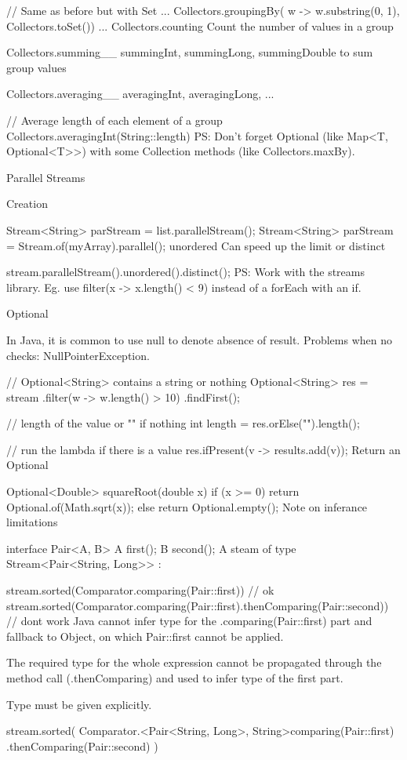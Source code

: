 // Same as before but with Set
... Collectors.groupingBy(
	w -> w.substring(0, 1), Collectors.toSet()) ...
Collectors.counting Count the number of values in a group

Collectors.summing\_\_ summingInt, summingLong, summingDouble to sum group values

Collectors.averaging\_\_ averagingInt, averagingLong, ...

// Average length of each element of a group
Collectors.averagingInt(String::length)
PS: Don't forget Optional (like Map<T, Optional<T>>) with some Collection methods (like Collectors.maxBy).

Parallel Streams

Creation

Stream<String> parStream = list.parallelStream();
Stream<String> parStream = Stream.of(myArray).parallel();
unordered Can speed up the limit or distinct

stream.parallelStream().unordered().distinct();
PS: Work with the streams library. Eg. use filter(x -> x.length() < 9) instead of a forEach with an if.

Optional

In Java, it is common to use null to denote absence of result. Problems when no checks: NullPointerException.

// Optional<String> contains a string or nothing
Optional<String> res = stream
   .filter(w -> w.length() > 10)
   .findFirst();

// length of the value or "" if nothing
int length = res.orElse("").length();

// run the lambda if there is a value
res.ifPresent(v -> results.add(v));
Return an Optional

Optional<Double> squareRoot(double x) {
   if (x >= 0) { return Optional.of(Math.sqrt(x)); }
   else { return Optional.empty(); }
}
Note on inferance limitations

interface Pair<A, B> {
    A first();
    B second();
}
A steam of type Stream<Pair<String, Long>> :

stream.sorted(Comparator.comparing(Pair::first)) // ok
stream.sorted(Comparator.comparing(Pair::first).thenComparing(Pair::second)) // dont work
Java cannot infer type for the .comparing(Pair::first) part and fallback to Object, on which Pair::first cannot be applied.

The required type for the whole expression cannot be propagated through the method call (.thenComparing) and used to infer type of the first part.

Type must be given explicitly.

stream.sorted(
    Comparator.<Pair<String, Long>, String>comparing(Pair::first)
    .thenComparing(Pair::second)
)
